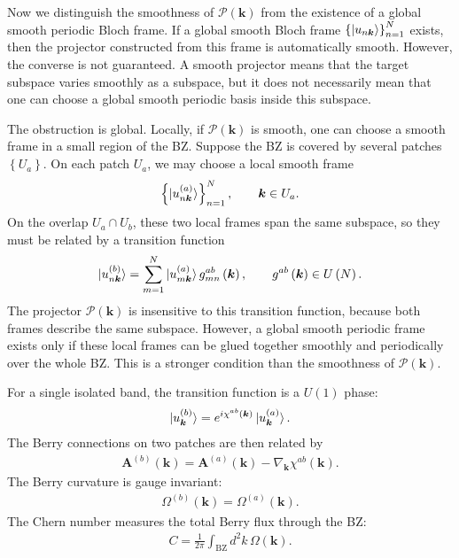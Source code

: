 \documentclass[12pt, oneside]{article}
\newcommand{\mr}[1]{\mathrm{#1}}
\newcommand{\p}[1]{\left(#1\right)}
\newcommand{\br}[1]{\left\{#1\right\}}
\numberwithin{equation}{subsection}
\begin{document}
Now we distinguish the smoothness of \(\mathcal{P}\p{\bm{k}}\) from the existence of a global smooth periodic Bloch frame. If a global smooth Bloch frame \(\br{\ket{u_{n\bm{k}}}}_{n=1}^{N}\) exists, then the projector constructed from this frame is automatically smooth. However, the converse is not guaranteed. A smooth projector means that the target subspace varies smoothly as a subspace, but it does not necessarily mean that one can choose a global smooth periodic basis inside this subspace.

The obstruction is global. Locally, if \(\mathcal{P}\p{\bm{k}}\) is smooth, one can choose a smooth frame in a small region of the BZ. Suppose the BZ is covered by several patches \(\br{U_a}\). On each patch \(U_a\), we may choose a local smooth frame
\begin{align}
	\br{\ket{u^{(a)}_{n\bm{k}}}}_{n=1}^{N},\qquad \bm{k}\in U_a.
\end{align}
On the overlap \(U_a\cap U_b\), these two local frames span the same subspace, so they must be related by a transition function
\begin{align}
	\ket{u^{(b)}_{n\bm{k}}}=\sum_{m=1}^{N}\ket{u^{(a)}_{m\bm{k}}}g^{ab}_{mn}\p{\bm{k}},\qquad g^{ab}\p{\bm{k}}\in U\p{N}.
\end{align}
The projector \(\mathcal{P}\p{\bm{k}}\) is insensitive to this transition function, because both frames describe the same subspace. However, a global smooth periodic frame exists only if these local frames can be glued together smoothly and periodically over the whole BZ. This is a stronger condition than the smoothness of \(\mathcal{P}\p{\bm{k}}\).

For a single isolated band, the transition function is a \(U\p{1}\) phase:
\begin{align}
	\ket{u^{(b)}_{\bm{k}}}=e^{i\chi^{ab}\p{\bm{k}}}\ket{u^{(a)}_{\bm{k}}}.
\end{align}
The Berry connections on two patches are then related by
\begin{align}
	\bm{A}^{(b)}\p{\bm{k}}=\bm{A}^{(a)}\p{\bm{k}}-\nabla_{\bm{k}}\chi^{ab}\p{\bm{k}}.
\end{align}
The Berry curvature is gauge invariant:
\begin{align}
	\Omega^{(b)}\p{\bm{k}}=\Omega^{(a)}\p{\bm{k}}.
\end{align}
The Chern number measures the total Berry flux through the BZ:
\begin{align}
	C=\frac{1}{2\pi}\int_{\mr{BZ}}d^2k\,\Omega\p{\bm{k}}.
\end{align}
\end{document}

